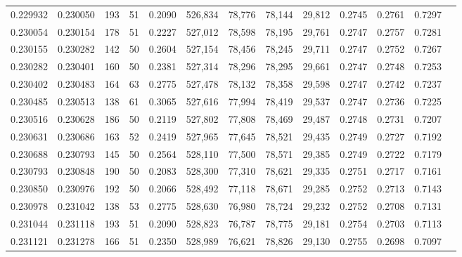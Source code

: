 \begin{tabular}{rrrrrrrrrrrrr}
0.229932 & 0.230050 &   193 &  51 &                                     0.2090 & 526,834 &  78,776 &  78,144 &  29,812 & 0.2745 & 0.2761 & 0.7297 \\
0.230054 & 0.230154 &   178 &  51 &                                     0.2227 & 527,012 &  78,598 &  78,195 &  29,761 & 0.2747 & 0.2757 & 0.7281 \\
0.230155 & 0.230282 &   142 &  50 &                                     0.2604 & 527,154 &  78,456 &  78,245 &  29,711 & 0.2747 & 0.2752 & 0.7267 \\
0.230282 & 0.230401 &   160 &  50 &                                     0.2381 & 527,314 &  78,296 &  78,295 &  29,661 & 0.2747 & 0.2748 & 0.7253 \\
0.230402 & 0.230483 &   164 &  63 &                                     0.2775 & 527,478 &  78,132 &  78,358 &  29,598 & 0.2747 & 0.2742 & 0.7237 \\
0.230485 & 0.230513 &   138 &  61 &                                     0.3065 & 527,616 &  77,994 &  78,419 &  29,537 & 0.2747 & 0.2736 & 0.7225 \\
0.230516 & 0.230628 &   186 &  50 &                                     0.2119 & 527,802 &  77,808 &  78,469 &  29,487 & 0.2748 & 0.2731 & 0.7207 \\
0.230631 & 0.230686 &   163 &  52 &                                     0.2419 & 527,965 &  77,645 &  78,521 &  29,435 & 0.2749 & 0.2727 & 0.7192 \\
0.230688 & 0.230793 &   145 &  50 &                                     0.2564 & 528,110 &  77,500 &  78,571 &  29,385 & 0.2749 & 0.2722 & 0.7179 \\
0.230793 & 0.230848 &   190 &  50 &                                     0.2083 & 528,300 &  77,310 &  78,621 &  29,335 & 0.2751 & 0.2717 & 0.7161 \\
0.230850 & 0.230976 &   192 &  50 &                                     0.2066 & 528,492 &  77,118 &  78,671 &  29,285 & 0.2752 & 0.2713 & 0.7143 \\
0.230978 & 0.231042 &   138 &  53 &                                     0.2775 & 528,630 &  76,980 &  78,724 &  29,232 & 0.2752 & 0.2708 & 0.7131 \\
0.231044 & 0.231118 &   193 &  51 &                                     0.2090 & 528,823 &  76,787 &  78,775 &  29,181 & 0.2754 & 0.2703 & 0.7113 \\
0.231121 & 0.231278 &   166 &  51 &                                     0.2350 & 528,989 &  76,621 &  78,826 &  29,130 & 0.2755 & 0.2698 & 0.7097 \\

\end{tabular}
